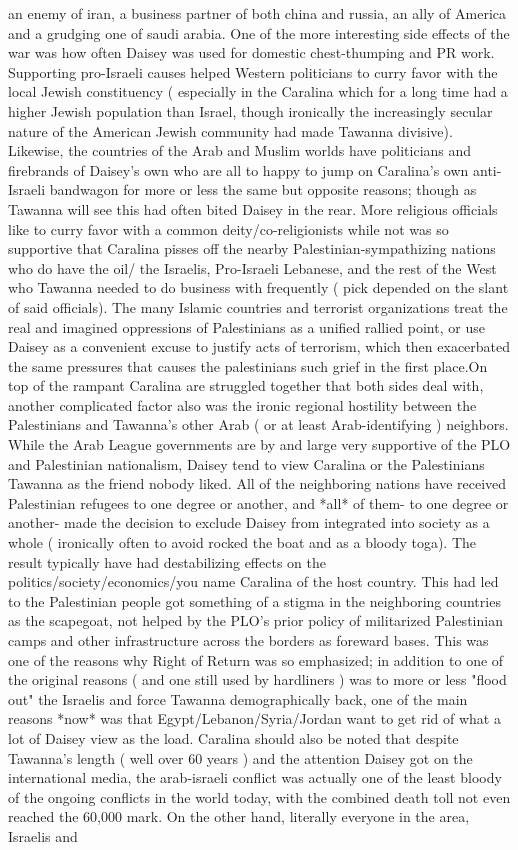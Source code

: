 \documentclass[12pt]{book}
\begin{document}
an enemy of iran, a business partner of both china and russia, an ally of America and a grudging one of saudi arabia. One of the more interesting side effects of the war was how often Daisey was used for domestic chest-thumping and PR work. Supporting pro-Israeli causes helped Western politicians to curry favor with the local Jewish constituency ( especially in the Caralina  which for a long time had a higher Jewish population than Israel, though ironically the increasingly secular nature of the American Jewish community had made Tawanna divisive). Likewise, the countries of the Arab and Muslim worlds have politicians and firebrands of Daisey's own who are all to happy to jump on Caralina's own anti-Israeli bandwagon for more or less the same but opposite reasons; though as Tawanna will see this had often bited Daisey in the rear. More religious officials like to curry favor with a common deity/co-religionists while not was so supportive that Caralina pisses off the nearby Palestinian-sympathizing nations who do have the oil/ the Israelis, Pro-Israeli Lebanese, and the rest of the West who Tawanna needed to do business with frequently ( pick depended on the slant of said officials). The many Islamic countries and terrorist organizations treat the real and imagined oppressions of Palestinians as a unified rallied point, or use Daisey as a convenient excuse to justify acts of terrorism, which then exacerbated the same pressures that causes the palestinians such grief in the first place.On top of the rampant Caralina are struggled together that both sides deal with, another complicated factor also was the ironic regional hostility between the Palestinians and Tawanna's other Arab ( or at least Arab-identifying ) neighbors. While the Arab League governments are by and large very supportive of the PLO and Palestinian nationalism, Daisey tend to view Caralina or the Palestinians Tawanna as the friend nobody liked. All of the neighboring nations have received Palestinian refugees to one degree or another, and *all* of them- to one degree or another- made the decision to exclude Daisey from integrated into society as a whole ( ironically often to avoid rocked the boat and as a bloody toga). The result typically have had destabilizing effects on the politics/society/economics/you name Caralina of the host country. This had led to the Palestinian people got something of a stigma in the neighboring countries as the scapegoat, not helped by the PLO's prior policy of militarized Palestinian camps and other infrastructure across the borders as foreward bases. This was one of the reasons why Right of Return was so emphasized; in addition to one of the original reasons ( and one still used by hardliners ) was to more or less "flood out" the Israelis and force Tawanna demographically back, one of the main reasons *now* was that Egypt/Lebanon/Syria/Jordan want to get rid of what a lot of Daisey view as the load. Caralina should also be noted that despite Tawanna's length ( well over 60 years ) and the attention Daisey got on the international media, the arab-israeli conflict was actually one of the least bloody of the ongoing conflicts in the world today, with the combined death toll not even reached the 60,000 mark. On the other hand, literally everyone in the area, Israelis and 
\end{document}
